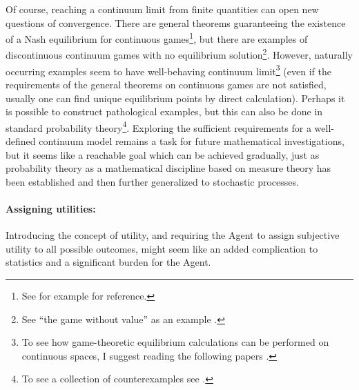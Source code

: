 \documentclass{article}
\begin{document}
Of course, reaching a continuum limit from finite quantities can open new questions of convergence. There are general theorems guaranteeing the existence of a Nash equilibrium for continuous games\footnote{See for example \cite{paper:ContinuousEquilibrium,paper:SeparableGames} for reference.}, but there are examples of discontinuous continuum games with no equilibrium solution\footnote{See ``the game without value'' as an example \cite{paper:DiscontinuousGames}.}.
However, naturally occurring examples seem to have well-behaving continuum limit\footnote{To see how game-theoretic equilibrium calculations can be performed on continuous spaces, I suggest reading the following papers \cite{Kashyap1971,Kashyap1974,paper:Abbott2018,paper:Abbott2023}.} (even if the requirements of the general theorems on continuous games are not satisfied, usually one can find unique equilibrium points by direct calculation).
Perhaps it is possible to construct pathological examples, but this can also be done in standard probability theory\footnote{To see a collection of counterexamples see \cite{book:CounterexamplesInProbability,book:CounterexamplesInProbabilityAndRealAnalysis,book:CounterexamplesInProbabilityAndStatistics}.}.
Exploring the sufficient requirements for a well-defined continuum model remains a task for future mathematical investigations, but it seems like a reachable goal which can be achieved gradually, just as probability theory as a mathematical discipline based on measure theory has been established and then further generalized to stochastic processes.




\paragraph{Assigning utilities:}
Introducing the concept of utility, and requiring the Agent to assign subjective utility to all possible outcomes, might seem like an added complication to statistics and a significant burden for the Agent.
\end{document}
